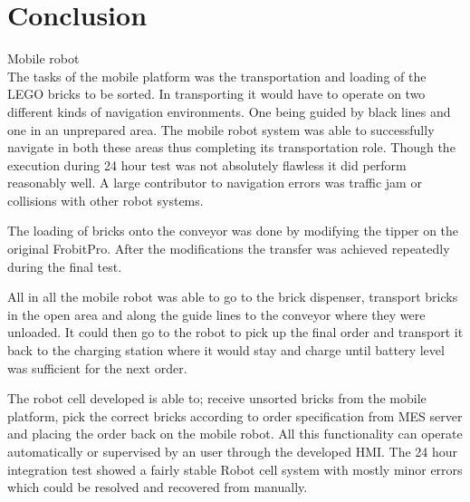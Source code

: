 \chapter{Conclusion}\label{chap:conclusion}
Mobile robot\\
The tasks of the mobile platform was the transportation and loading of the LEGO bricks to be sorted. In transporting it would have to operate on two different kinds of navigation environments. One being guided by black lines and one in an unprepared area. The mobile robot system was able to successfully navigate in both these areas thus completing its transportation role. Though the execution during 24 hour test was not absolutely flawless it did perform reasonably well. A large contributor to navigation errors was traffic jam or collisions with other robot systems. 

The loading of bricks onto the conveyor was done by modifying the tipper on the original FrobitPro. After the modifications the transfer was achieved repeatedly  during the final test. 

All in all the mobile robot was able to go to the brick dispenser, transport bricks in the open area and along the guide lines to the conveyor where they were unloaded. It could then go to the robot to pick up the final order and transport it back to the charging station where it would stay and charge until battery level was sufficient for the next order.


The robot cell developed is able to; receive unsorted bricks from the mobile platform, pick the correct bricks according to order specification from MES server and placing the order back on the mobile robot. All this functionality can operate automatically or supervised by an user through the developed HMI. The 24 hour integration test showed a fairly stable Robot cell system with mostly minor errors which could be resolved and recovered from manually.




